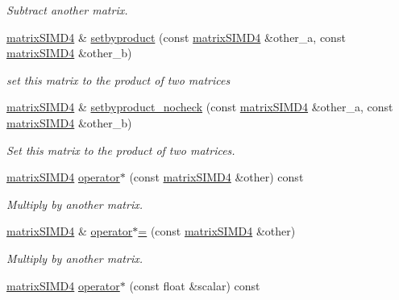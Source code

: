 \begin{DoxyCompactItemize}
\begin{DoxyCompactList}\small\item\em Subtract another matrix. \end{DoxyCompactList}\item 
\hyperlink{classirr_1_1core_1_1matrixSIMD4}{matrix\+S\+I\+M\+D4} \& \hyperlink{classirr_1_1core_1_1matrixSIMD4_a82b9d8e97f225f4b227e1cb1dd23291f}{setbyproduct} (const \hyperlink{classirr_1_1core_1_1matrixSIMD4}{matrix\+S\+I\+M\+D4} \&other\+\_\+a, const \hyperlink{classirr_1_1core_1_1matrixSIMD4}{matrix\+S\+I\+M\+D4} \&other\+\_\+b)
\begin{DoxyCompactList}\small\item\em set this matrix to the product of two matrices \end{DoxyCompactList}\item 
\hyperlink{classirr_1_1core_1_1matrixSIMD4}{matrix\+S\+I\+M\+D4} \& \hyperlink{classirr_1_1core_1_1matrixSIMD4_aab1e846c3b1bcd94239c1a2455bd8c16}{setbyproduct\+\_\+nocheck} (const \hyperlink{classirr_1_1core_1_1matrixSIMD4}{matrix\+S\+I\+M\+D4} \&other\+\_\+a, const \hyperlink{classirr_1_1core_1_1matrixSIMD4}{matrix\+S\+I\+M\+D4} \&other\+\_\+b)
\begin{DoxyCompactList}\small\item\em Set this matrix to the product of two matrices. \end{DoxyCompactList}\item 
\hyperlink{classirr_1_1core_1_1matrixSIMD4}{matrix\+S\+I\+M\+D4} \hyperlink{classirr_1_1core_1_1matrixSIMD4_a7dda90f3288b11f8ab19f64606680ef9}{operator$\ast$} (const \hyperlink{classirr_1_1core_1_1matrixSIMD4}{matrix\+S\+I\+M\+D4} \&other) const 
\begin{DoxyCompactList}\small\item\em Multiply by another matrix. \end{DoxyCompactList}\item 
\hyperlink{classirr_1_1core_1_1matrixSIMD4}{matrix\+S\+I\+M\+D4} \& \hyperlink{classirr_1_1core_1_1matrixSIMD4_add40fc064a657e7a7882f819a0d61c4d}{operator$\ast$=} (const \hyperlink{classirr_1_1core_1_1matrixSIMD4}{matrix\+S\+I\+M\+D4} \&other)
\begin{DoxyCompactList}\small\item\em Multiply by another matrix. \end{DoxyCompactList}\item 
\hyperlink{classirr_1_1core_1_1matrixSIMD4}{matrix\+S\+I\+M\+D4} \hyperlink{classirr_1_1core_1_1matrixSIMD4_a2ba0cce4dd071f46239d302bc2f717f9}{operator$\ast$} (const float \&scalar) const \hypertarget{classirr_1_1core_1_1matrixSIMD4_a2ba0cce4dd071f46239d302bc2f717f9}{}\label{classirr_1_1core_1_1matrixSIMD4_a2ba0cce4dd071f46239d302bc2f717f9}


\end{DoxyCompactItemize}
